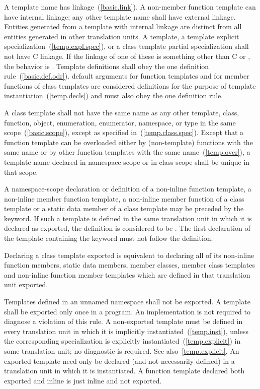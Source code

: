\pnum
{}%
A template name has linkage~(\ref{basic.link}).
A non-member
function template can have internal linkage; any other
template name shall have external linkage. Entities generated from
a template with internal linkage are
distinct from all entities generated in other translation units.
A template, a template explicit specialization~(\ref{temp.expl.spec}), or a class
template partial specialization shall not have C linkage.
If the linkage of one of these is something
other than C or \Cpp, the behavior is
.
Template definitions shall obey the one definition rule~(\ref{basic.def.odr}).
\enternote
default arguments for function templates and for member functions of
class templates are considered definitions for the purpose of template
instantiation~(\ref{temp.decls}) and must also obey the one definition rule.
\exitnote

\pnum
A class template shall not have the same name as any other
template, class, function, object, enumeration, enumerator, namespace, or
type in the same scope~(\ref{basic.scope}), except as specified in~(\ref{temp.class.spec}).
Except that a function template can be overloaded either by (non-template)
functions with the same name or by other function templates
with the same name~(\ref{temp.over}),
a template name declared in namespace scope or in class scope shall be unique
in that scope.

\pnum
A namespace-scope declaration or definition of a non-inline function
template, a non-inline member function template, a non-inline member
function of a class template or a static data member of a class template
may be preceded by the  keyword. If such a template is defined
in the same translation unit in which it is declared as exported, the
definition is considered to be . The first declaration of the
template containing the  keyword must not follow the definition.

\pnum
Declaring a class template exported is equivalent to declaring all of its
non-inline function members, static data members, member classes, member
class templates and non-inline function member templates which
are defined in that translation unit exported.

\pnum
Templates defined in an unnamed namespace shall not be exported. A template
shall be exported only once in a program. An implementation is not required
to diagnose a violation of this rule. A non-exported template must
be defined in every translation unit in
which it is implicitly instantiated~(\ref{temp.inst}), unless the
corresponding specialization is explicitly instantiated~(\ref{temp.explicit})
in some translation unit; no diagnostic is required.
\enternote
See also~\ref{temp.explicit}.
\exitnote
An exported template need only be declared (and not necessarily defined)
in a translation unit in which it is instantiated. A function template
declared both exported and inline is just inline and not exported.

